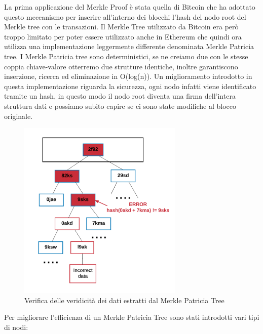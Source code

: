 \documentclass[12pt]{report}
\begin{document}
La prima applicazione del Merkle Proof è stata quella di Bitcoin che ha adottato questo meccanismo per inserire all'interno dei blocchi l'hash del nodo root del Merkle tree con le transazioni. 
Il Merkle Tree utilizzato da Bitcoin era però troppo limitato per poter essere utilizzato anche in Ethereum che quindi ora utilizza una implementazione leggermente differente denominata Merkle Patricia tree.
I Merkle Patricia tree sono deterministici, se ne creiamo due con le stesse coppia chiave-valore otterremo due strutture identiche, inoltre garantiscono inserzione, ricerca ed eliminazione in O(log(n)).
Un miglioramento introdotto in questa implementazione riguarda la sicurezza, ogni nodo infatti viene identificato tramite un hash, in questo modo il nodo root diventa una firma dell'intera struttura dati e possiamo subito capire se ci sono state modifiche al blocco originale.
\begin{figure}[H]
    \centering\includegraphics[width=0.7\textwidth]{MerkleTreeError}
    \caption{Verifica delle veridicità dei dati estratti dal Merkle Patricia Tree}
\end{figure}


Per migliorare l'efficienza di un Merkle Patricia Tree sono stati introdotti vari tipi di nodi:
\end{document}

